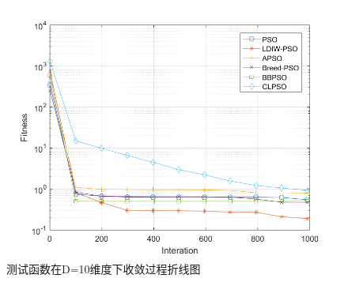 \begin{figure}[htbp]
{\begin{minipage}[b]{0.32\linewidth}
			\includegraphics[width=1\linewidth]{pic/Schwefel1}\vspace{4pt}
	\end{minipage}}
	\caption{测试函数在D=10维度下收敛过程折线图}
\end{figure}

